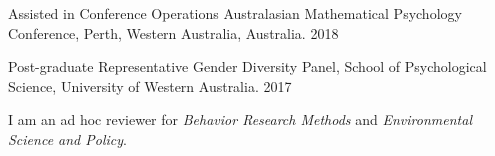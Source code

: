     \begin{cvhonors}
    
    
    \cvhonor
    {Assisted in Conference Operations} %
    {Australasian Mathematical Psychology Conference, Perth, Western Australia, Australia.} %
    {} %
    {2018} %
      
    \cvhonor
    {Post-graduate Representative} %
    {Gender Diversity Panel, School of Psychological Science, University of Western Australia.} %
    {} %
    {2017} %


    
\end{cvhonors}
\begin{minipage}{\textwidth}

\begin{small} \color{black}
I am an ad hoc reviewer for \textit{Behavior Research Methods} and \textit{Environmental Science and Policy}.
\end{small}
\end{minipage}


